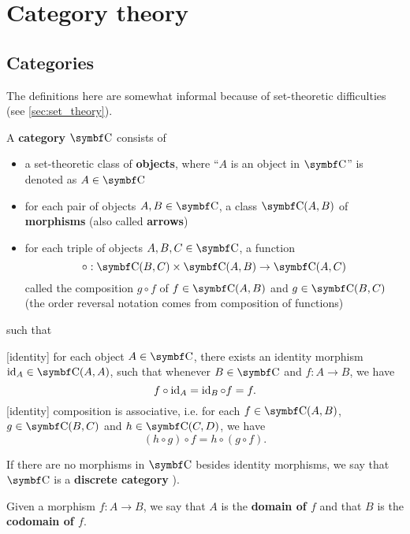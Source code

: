 \section{Category theory}\label{sec:category_theory}
\subsection{Categories}\label{subsec:categories}

\begin{note}
  The definitions here are somewhat informal because of set-theoretic difficulties (see \cref{sec:set_theory}).
\end{note}

\begin{definition}\label{def:category}\cite[definition 1.1.1]{Leinster2014}
  A \textbf{category} \( \Bold C \) consists of
  \begin{itemize}
    \item a set-theoretic class of \textbf{objects}, where \enquote{\( A \) is an object in \( \Bold C \)} is denoted as \( A \in \Bold C \)
    \item for each pair of objects \( A, B \in \Bold C \), a class \( {\Bold C}(A, B) \) of \textbf{morphisms} (also called \textbf{arrows})
    \item for each triple of objects \( A, B, C \in \Bold C \), a function
    \begin{equation*}
      \circ: {\Bold C}(B, C) \times {\Bold C}(A, B) \to {\Bold C}(A, C)
    \end{equation*}
    called the composition \( g \circ f \) of \( f \in {\Bold C}(A, B) \) and \( g \in {\Bold C}(B, C) \) (the order reversal notation comes from composition of functions)
  \end{itemize}
  such that
  \begin{description}
    [identity] for each object \( A \in \Bold C \), there exists an identity morphism \( \Id_A \in {\Bold C}(A, A) \), such that whenever \( B \in \Bold{C} \) and \( f: A \to B \), we have
    \begin{equation*}
      f \circ \operatorname{id}_A = \operatorname{id}_B \circ f = f.
    \end{equation*}
    [identity] composition is associative, i.e. for each \( f \in {\Bold C}(A, B) \), \( g \in {\Bold C}(B, C) \) and \( h \in {\Bold C}(C, D) \), we have
    \begin{equation*}
      (h \circ g) \circ f = h \circ (g \circ f).
    \end{equation*}
  \end{description}

  If there are no morphisms in \( \Bold C \) besides identity morphisms, we say that \( \Bold C \) is a \textbf{discrete category} \cite[example 1.1.18(b]{Leinster2014}).

  Given a morphism \( f: A \to B \), we say that \( A \) is the \textbf{domain of \( f \)} and that \( B \) is the \textbf{codomain of \( f \)}.
\end{definition}

